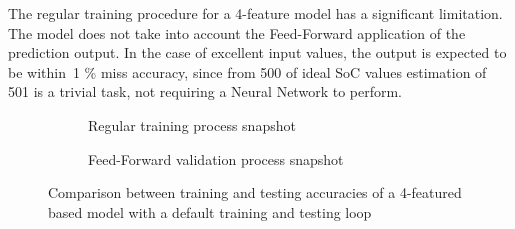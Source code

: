 The regular training procedure for a 4-feature model has a significant limitation. The model does not take into account the Feed-Forward application of the prediction output.
In the case of excellent input values, the output is expected to be within~1 \% miss accuracy, since from 500 of ideal SoC values estimation of 501 is a trivial task, not requiring a Neural Network to perform.
\begin{figure}[htbp]
    \centering
    \begin{subfigure}[b]{\columnwidth}
        \centering
        
        \caption{Regular training process snapshot}
        \label{subfig:regular_tr}
    \end{subfigure}
    \hfill
    \begin{subfigure}[b]{\columnwidth}
        \centering
        \caption{Feed-Forward validation process snapshot}
        \label{subfig:regular_ts}
    \end{subfigure}
    \caption{Comparison between training and testing accuracies of a 4-featured based model with a default training and testing loop}
    \label{fig:regular_tr}
\end{figure}

